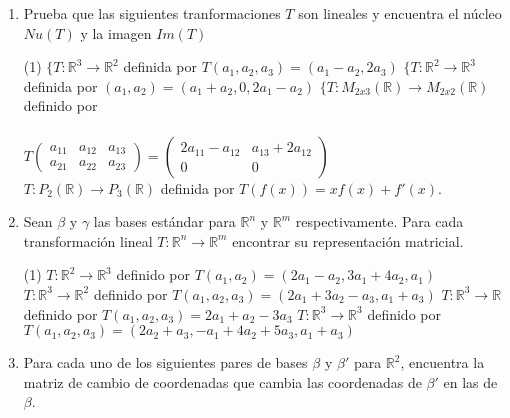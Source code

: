 \documentclass[letterpaper,11pt]{article}
\begin{document}
\begin{enumerate}
\item Prueba que las siguientes tranformaciones $T$ son lineales y encuentra el núcleo $Nu(T)$ y la imagen $Im(T)$

\begin{tasks}(1)
\task $\lbrace T: \mathbb{R}^{3} \longrightarrow \mathbb{R}^{2}$ definida por $T(a_{1},a_{2},a_{3}) = (a_{1} - a_{2}, 2a_{3})$
\task $\lbrace T: \mathbb{R}^{2} \longrightarrow \mathbb{R}^{3}$ definida por $(a_{1},a_{2}) = (a_{1} + a_{2}, 0, 2a_{1} - a_{2})$
\task $\lbrace T: M_{2x3}(\mathbb{R}) \longrightarrow M_{2x2}(\mathbb{R})$ definido por\\
\\
$T \begin{pmatrix} a_{11} & a_{12} & a_{13} \\ a_{21} & a_{22} & a_{23} \end{pmatrix} = \begin{pmatrix} 2a_{11} - a_{12} & a_{13} + 2a_{12} \\ 0 & 0 \end{pmatrix}$
\\
\task $T: P_{2}(\mathbb{R}) \longrightarrow P_{3}(\mathbb{R})$ definida por $T(f(x)) = xf(x) + f'(x)$.
\end{tasks}
 
\item Sean $\beta$ y $\gamma$ las bases estándar para $\mathbb{R}^{n}$ y $\mathbb{R}^{m}$ respectivamente. Para cada transformación lineal $T: \mathbb{R}^{n} \longrightarrow \mathbb{R}^{m}$ encontrar su representación matricial.
\begin{tasks}(1)
\task $T: \mathbb{R}^{2} \longrightarrow \mathbb{R}^{3}$ definido por $T(a_{1},a_{2}) = (2a_{1} - a_{2}, 3a_{1} + 4a_{2},a_{1})$
\task $T: \mathbb{R}^{3} \longrightarrow \mathbb{R}^{2}$ definido por $T(a_{1},a_{2},a_{3}) = (2a_{1} + 3a_{2} - a_{3}, a_{1} + a_{3})$
\task $T: \mathbb{R}^{3} \longrightarrow \mathbb{R}$ definido por $T(a_{1},a_{2},a_{3}) = 2a_{1} + a_{2} - 3a_{3}$
\task $T: \mathbb{R}^{3} \longrightarrow \mathbb{R}^{3}$ definido por $T(a_{1},a_{2},a_{3}) = (2a_{2} + a_{3}, -a_{1} + 4a_{2} + 5a_{3},a_{1} + a_{3})$
\end{tasks}

\newpage
\item Para cada uno de los siguientes pares de bases $\beta$ y $\beta'$ para $\mathbb{R}^{2}$, encuentra la matriz de cambio de coordenadas que cambia las coordenadas de $\beta'$ en las de $\beta$.


\end{enumerate}
\end{document}
